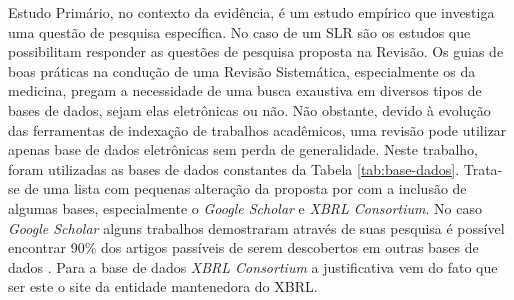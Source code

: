\documentclass[12pt]{article}
\begin{document}
Estudo Primário, no contexto da evidência, é um estudo empírico que investiga
uma questão de pesquisa específica\cite{keele2007guidelines}. No caso de um SLR são os estudos que
possibilitam responder as questões de pesquisa proposta na Revisão. Os guias de boas práticas na condução de uma Revisão Sistemática, especialmente
os da medicina, pregam a necessidade de uma busca exaustiva em diversos tipos
de bases de dados, sejam elas eletrônicas ou não. Não obstante, devido à
evolução das ferramentas de indexação de trabalhos acadêmicos, uma revisão pode
utilizar apenas base de dados eletrônicas sem perda de generalidade. Neste
trabalho, foram utilizadas as bases de dados constantes da Tabela
\ref{tab:base-dados}. Trata-se de uma lista com pequenas alteração da
proposta por \cite{Brereton2007571} com a inclusão de algumas bases,
especialmente o \textit{Google Scholar} e  \textit{XBRL Consortium}. No caso
\textit{Google Scholar} alguns trabalhos demostraram através de suas pesquisa é
possível encontrar 90\% dos artigos passíveis de serem descobertos em outras
bases de dados \cite{yasin2012quality}. Para a base de dados \textit{XBRL
  Consortium} a justificativa vem do fato que ser este o  site da entidade mantenedora do XBRL.
\end{document}
